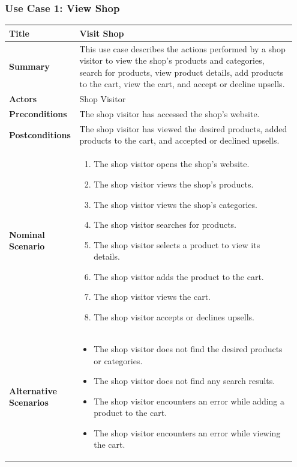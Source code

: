 \subsubsection{Use Case 1: View Shop}
\begin{longtable}{|p{0.2\linewidth}|p{0.75\linewidth}|}
\hline
\textbf{Title} & Visit Shop \\
\hline
\textbf{Summary} & This use case describes the actions performed by a shop visitor to view the shop's products and categories, search for products, view product details, add products to the cart, view the cart, and accept or decline upsells. \\
\hline
\textbf{Actors} & Shop Visitor \\
\hline
\textbf{Preconditions} & The shop visitor has accessed the shop's website. \\
\hline
\textbf{Postconditions} & The shop visitor has viewed the desired products, added products to the cart, and accepted or declined upsells. \\
\hline
\textbf{Nominal Scenario} & 
\begin{enumerate}
    \item The shop visitor opens the shop's website.
    \item The shop visitor views the shop's products.
    \item The shop visitor views the shop's categories.
    \item The shop visitor searches for products.
    \item The shop visitor selects a product to view its details.
    \item The shop visitor adds the product to the cart.
    \item The shop visitor views the cart.
    \item The shop visitor accepts or declines upsells.
\end{enumerate} \\
\hline
\textbf{Alternative Scenarios} & 
\begin{itemize}
    \item The shop visitor does not find the desired products or categories.
    \item The shop visitor does not find any search results.
    \item The shop visitor encounters an error while adding a product to the cart.
    \item The shop visitor encounters an error while viewing the cart.
\end{itemize} \\
\hline
\end{longtable}

